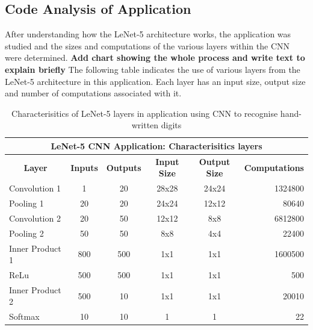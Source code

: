 \subsection{Code Analysis of Application}
\label{sect5_3_1}
After understanding how the LeNet-5 architecture works, the application was studied and the sizes and computations of the various layers within the CNN were determined.\newline\newline
\textbf{Add chart showing the whole process and write text to explain briefly} \newline\newline
The following table indicates the use of various layers from the LeNet-5 architecture in this application. Each layer has an input size, output size and number of computations associated with it.

\begin{table}[h!]
\centering
 \caption{Characterisitics of LeNet-5 layers in application using CNN to recognise hand-written digits}
 \vspace{3mm}
 \renewcommand\arraystretch{1.6}
 \begin{tabular}{ | m{7em} | c | c | c | c | r | }
 \hline
 \multicolumn{6}{|c|}{LeNet-5 CNN Application: Characterisitics layers} \\
 \hline
 \multicolumn{1}{|c|}{\bfseries Layer} & \multicolumn{1}{c|}{\bfseries Inputs} & \multicolumn{1}{c|}{\bfseries Outputs} & \multicolumn{1}{c|}{\bfseries Input Size} & \multicolumn{1}{c|}{\bfseries Output Size} & \multicolumn{1}{c|}{\bfseries Computations} \\
 \hline
 Convolution 1 & 1 & 20 & 28x28 & 24x24 & 1324800 \\
 \hline
 Pooling 1 & 20 & 20 & 24x24 & 12x12 & 80640 \\
 \hline
 Convolution 2 & 20 & 50 & 12x12 & 8x8 & 6812800 \\ 
 \hline
 Pooling 2 & 50 & 50 & 8x8 & 4x4 & 22400 \\
 \hline
 Inner Product 1 & 800 & 500 & 1x1 & 1x1 & 1600500 \\
 \hline
 ReLu & 500 & 500 & 1x1 & 1x1 & 500 \\
 \hline
 Inner Product 2 & 500 & 10 & 1x1 & 1x1 & 20010 \\
 \hline
 Softmax & 10 & 10 &  1 & 1 & 22 \\
 \hline
 \end{tabular}
 \label{table:mnist_layers_comp}
\end{table}

